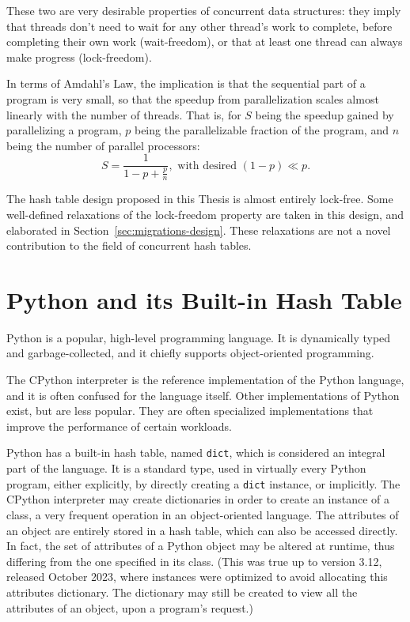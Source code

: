 These two are very desirable properties of concurrent data structures: they imply that threads don't need to wait for any other thread's work to complete, before completing their own work (wait-freedom), or that at least one thread can always make progress (lock-freedom).

In terms of Amdahl's Law, the implication is that the sequential part of a program is very small, so that the speedup from parallelization scales almost linearly with the number of threads.
That is, for $S$ being the speedup gained by parallelizing a program, $p$ being the parallelizable fraction of the program, and $n$ being the number of parallel processors:
\[
    S = \frac{1}{1 - p + \frac{p}{n}}, \text{~with~desired~} (1 - p) \ll p.
\]

The hash table design proposed in this Thesis is almost entirely lock-free.
Some well-defined relaxations of the lock-freedom property are taken in this design, and elaborated in Section~\ref{sec:migrations-design}.
These relaxations are not a novel contribution to the field of concurrent hash tables.


\section{Python and its Built-in Hash Table}\label{sec:dict-intro}

Python is a popular, high-level programming language.
It is dynamically typed and garbage-collected, and it chiefly supports object-oriented programming.

The CPython interpreter is the reference implementation of the Python language, and it is often confused for the language itself.
Other implementations of Python exist, but are less popular.
They are often specialized implementations that improve the performance of certain workloads.

Python has a built-in hash table, named \texttt{dict}, which is considered an integral part of the language.
It is a standard type, used in virtually every Python program, either explicitly, by directly creating a \texttt{dict} instance, or implicitly.
The CPython interpreter may create dictionaries in order to create an instance of a class, a very frequent operation in an object-oriented language.
The attributes of an object are entirely stored in a hash table, which can also be accessed directly.
In fact, the set of attributes of a Python object may be altered at runtime, thus differing from the one specified in its class.
(This was true up to version 3.12, released October 2023, where instances were optimized to avoid allocating this attributes dictionary.
The dictionary may still be created to view all the attributes of an object, upon a program's request.)


